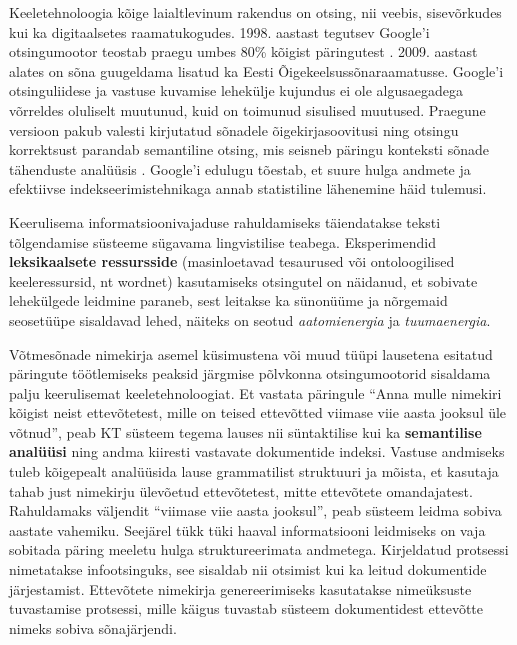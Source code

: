 \begin{multicols}{2}
Keeletehnoloogia kõige laialtlevinum rakendus on otsing, nii veebis, sisevõrkudes kui ka digitaalsetes raamatukogudes.  1998. aastast tegutsev Google’i otsingumootor teostab praegu umbes 80\% kõigist päringutest \cite{spi1}.  2009. aastast alates on sõna guugeldama lisatud ka Eesti Õigekeelsussõnaraamatusse.  Google’i otsinguliidese ja vastuse kuvamise lehekülje kujundus ei ole algusaegadega võrreldes oluliselt muutunud, kuid on toimunud sisulised muutused.  Praegune versioon pakub valesti kirjutatud sõnadele õigekirjasoovitusi ning otsingu korrektsust parandab semantiline otsing, mis seisneb päringu konteksti sõnade tähenduste analüüsis \cite{pc1}.  Google’i edulugu tõestab, et suure hulga andmete ja efektiivse indekseerimistehnikaga annab statistiline lähenemine häid tulemusi.


Keerulisema informatsioonivajaduse rahuldamiseks täiendatakse teksti tõlgendamise süsteeme sügavama lingvistilise teabega.  Eksperimendid \textbf{leksikaalsete ressursside} (masinloetavad tesaurused või ontoloogilised keeleressursid, nt wordnet) kasutamiseks otsingutel on näidanud, et sobivate lehekülgede leidmine paraneb, sest leitakse ka sünonüüme ja nõrgemaid seosetüüpe sisaldavad lehed, näiteks on seotud \textit{aatomienergia} ja \textit{tuumaenergia}.

Võtmesõnade nimekirja asemel küsimustena või muud tüüpi lausetena esitatud päringute töötlemiseks peaksid järgmise põlvkonna otsingumootorid sisaldama palju keerulisemat keeletehnoloogiat.  Et vastata päringule ``Anna mulle nimekiri kõigist neist ettevõtetest, mille on teised ettevõtted viimase viie aasta jooksul üle võtnud'', peab KT süsteem tegema lauses nii süntaktilise kui ka \textbf{semantilise analüüsi} ning andma kiiresti vastavate dokumentide indeksi.  Vastuse andmiseks tuleb kõigepealt analüüsida lause grammatilist struktuuri ja mõista, et kasutaja tahab just nimekirju ülevõetud ettevõtetest, mitte ettevõtete omandajatest.  Rahuldamaks väljendit ``viimase viie aasta jooksul'', peab süsteem leidma sobiva aastate vahemiku.  Seejärel tükk tüki haaval informatsiooni leidmiseks on vaja sobitada päring meeletu hulga struktureerimata andmetega.  Kirjeldatud protsessi nimetatakse infootsinguks, see sisaldab nii otsimist kui ka leitud dokumentide järjestamist.  Ettevõtete nimekirja genereerimiseks kasutatakse nimeüksuste tuvastamise protsessi, mille käigus tuvastab süsteem dokumentidest ettevõtte nimeks sobiva sõnajärjendi.


\end{multicols}
